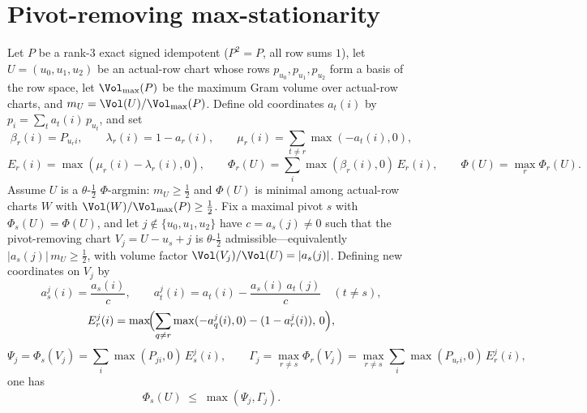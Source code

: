 \section{Pivot-removing max-stationarity}\label{sec:pivot-removing-move}

\begin{lemma}\label{lem:pivot-removing-move}
Let $P$ be a rank-$3$ exact signed idempotent ($P^2=P$, all row sums $1$), let
$U=(u_0,u_1,u_2)$ be an actual-row chart whose rows $p_{u_0},p_{u_1},p_{u_2}$
form a basis of the row space, let $\Vol_{\max}(P)$ be the maximum Gram volume
over actual-row charts, and $m_U=\Vol(U)/\Vol_{\max}(P)$. Define old coordinates
$a_t(i)$ by $p_i=\sum_t a_t(i)\,p_{u_t}$, and set
\[
  \beta_r(i)=P_{u_r i},\qquad \lambda_r(i)=1-a_r(i),\qquad
  \mu_r(i)=\sum_{t\neq r}\max(-a_t(i),0),
\]
\[
  E_r(i)=\max(\mu_r(i)-\lambda_r(i),0),\qquad
  \Phi_r(U)=\sum_i\max(\beta_r(i),0)\,E_r(i),\qquad
  \Phi(U)=\max_r\Phi_r(U).
\]
Assume $U$ is a $\theta$-$\tfrac12$ $\Phi$-argmin: $m_U\ge\tfrac12$ and $\Phi(U)$
is minimal among actual-row charts $W$ with $\Vol(W)/\Vol_{\max}(P)\ge\tfrac12$.
Fix a maximal pivot $s$ with $\Phi_s(U)=\Phi(U)$, and let
$j\notin\{u_0,u_1,u_2\}$ have $c=a_s(j)\neq0$ such that the pivot-removing chart
$V_j=U-u_s+j$ is $\theta$-$\tfrac12$ admissible---equivalently
$|a_s(j)|\,m_U\ge\tfrac12$, with volume factor $\Vol(V_j)/\Vol(U)=|a_s(j)|$.
Defining new coordinates on $V_j$ by
\[
  a_s^{j}(i)=\frac{a_s(i)}{c},\qquad
  a_t^{j}(i)=a_t(i)-\frac{a_s(i)\,a_t(j)}{c}\quad(t\neq s),
\]
\[
  E_r^{j}(i)=\max\!\Bigl(\sum_{q\neq r}\max(-a_q^{j}(i),0)-(1-a_r^{j}(i)),\,0\Bigr),
\]
\[
  \Psi_j=\Phi_s(V_j)=\sum_i\max(P_{ji},0)\,E_s^{j}(i),\qquad
  \Gamma_j=\max_{r\neq s}\Phi_r(V_j)=\max_{r\neq s}\sum_i\max(P_{u_r i},0)\,E_r^{j}(i),
\]
one has
\[
  \Phi_s(U)\;\le\;\max(\Psi_j,\Gamma_j).
\]
\end{lemma}

